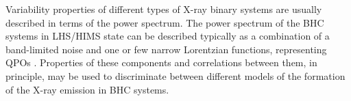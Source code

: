\documentclass[a4paper,fleqn,usenatbib]{mnras}
\begin{document}
%
%
%

Variability properties of different types of X-ray binary systems are usually described in terms of the power spectrum.
The power spectrum of the BHC systems in LHS/HIMS state can be described typically as a combination of a band-limited noise and one or few narrow Lorentzian functions, representing QPOs \citep[see, e.g.,][]{1972ApJ...174L..35T, 1990A&A...227L..33B, homan05}. 
Properties of these components and correlations between them, in principle, may be used to discriminate between different models of the formation of the X-ray emission in BHC systems. 
 
\end{document}
